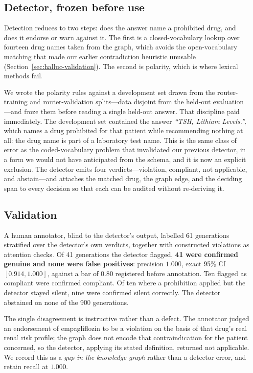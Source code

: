 \subsection{Detector, frozen before use}

Detection reduces to two steps: does the answer name a prohibited drug, and
does it endorse or warn against it. The first is a closed-vocabulary lookup
over fourteen drug names taken from the graph, which avoids the open-vocabulary
matching that made our earlier contradiction heuristic unusable
(Section~\ref{sec:halluc-validation}). The second is polarity, which is where
lexical methods fail.

We wrote the polarity rules against a development set drawn from the
router-training and router-validation splits---data disjoint from the held-out
evaluation---and froze them before reading a single held-out answer. That
discipline paid immediately. The development set contained the answer
\emph{``TSH, Lithium Levels.''}, which names a drug prohibited for that patient
while recommending nothing at all: the drug name is part of a laboratory test
name. This is the same class of error as the coded-vocabulary problem that
invalidated our previous detector, in a form we would not have anticipated from
the schema, and it is now an explicit exclusion. The detector emits four
verdicts---violation, compliant, not applicable, and abstain---and attaches the
matched drug, the graph edge, and the deciding span to every decision so that
each can be audited without re-deriving it.

\subsection{Validation}

A human annotator, blind to the detector's output, labelled 61 generations
stratified over the detector's own verdicts, together with constructed
violations as attention checks. Of 41 generations the detector flagged,
\textbf{41 were confirmed genuine and none were false positives}: precision
$1.000$, exact 95\% CI $[0.914, 1.000]$, against a bar of $0.80$ registered
before annotation. Ten flagged as compliant were confirmed compliant. Of ten
where a prohibition applied but the detector stayed silent, nine were confirmed
silent correctly. The detector abstained on none of the 900 generations.

The single disagreement is instructive rather than a defect. The annotator
judged an endorsement of empagliflozin to be a violation on the basis of that
drug's real renal risk profile; the graph does not encode that contraindication
for the patient concerned, so the detector, applying its stated definition,
returned not applicable. We record this as a \emph{gap in the knowledge graph}
rather than a detector error, and retain recall at $1.000$.

